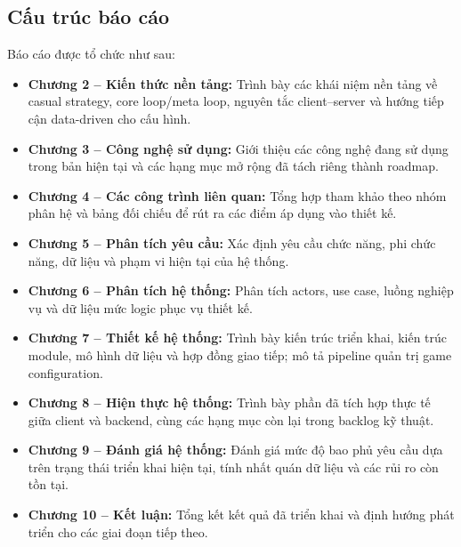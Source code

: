 \subsection{Cấu trúc báo cáo}

Báo cáo được tổ chức như sau:

\begin{itemize}
    \item \textbf{Chương 2 -- Kiến thức nền tảng:} Trình bày các khái niệm nền tảng về casual strategy, core loop/\allowbreak meta loop, nguyên tắc client--server và hướng tiếp cận data-driven cho cấu hình\cite{adams-game-design,schell-art}.
    \item \textbf{Chương 3 -- Công nghệ sử dụng:} Giới thiệu các công nghệ đang sử dụng trong bản hiện tại và các hạng mục mở rộng đã tách riêng thành roadmap\cite{unity-manual,nest-docs,mongodb-guide,redis-in-action}.
    \item \textbf{Chương 4 -- Các công trình liên quan:} Tổng hợp tham khảo theo nhóm phân hệ và bảng đối chiếu để rút ra các điểm áp dụng vào thiết kế.
    \item \textbf{Chương 5 -- Phân tích yêu cầu:} Xác định yêu cầu chức năng, phi chức năng, dữ liệu và phạm vi hiện tại của hệ thống.
    \item \textbf{Chương 6 -- Phân tích hệ thống:} Phân tích actors, use case, luồng nghiệp vụ và dữ liệu mức logic phục vụ thiết kế.
    \item \textbf{Chương 7 -- Thiết kế hệ thống:} Trình bày kiến trúc triển khai, kiến trúc module, mô hình dữ liệu và hợp đồng giao tiếp; mô tả pipeline quản trị game configuration.
    \item \textbf{Chương 8 -- Hiện thực hệ thống:} Trình bày phần đã tích hợp thực tế giữa client và backend, cùng các hạng mục còn lại trong backlog kỹ thuật.
    \item \textbf{Chương 9 -- Đánh giá hệ thống:} Đánh giá mức độ bao phủ yêu cầu dựa trên trạng thái triển khai hiện tại, tính nhất quán dữ liệu và các rủi ro còn tồn tại.
    \item \textbf{Chương 10 -- Kết luận:} Tổng kết kết quả đã triển khai và định hướng phát triển cho các giai đoạn tiếp theo.
\end{itemize}

